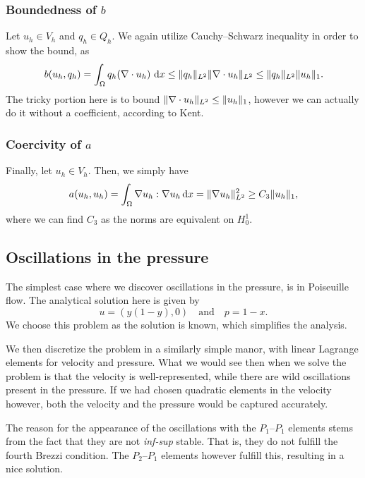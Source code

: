 \subsubsection{Boundedness of \texorpdfstring{$b$}{b}}
Let $u_h \in V_h$ and $q_h \in Q_h$.
We again utilize Cauchy--Schwarz inequality in order to show the bound, as %
\begin{equation}
    b(u_h, q_h)
    = \int_{\Omega} q_h (\nabla \cdot u_h) \, \mathop{}\!\mathrm{d} x
    \leq \lVert q_h\rVert_{L^2} \lVert\nabla \cdot u_h\rVert_{L^2}
    \leq \lVert q_h\rVert_{L^2} \lVert u_h\rVert_{1}.
\end{equation}
The tricky portion here is to bound $\lVert\nabla \cdot u_h\rVert_{L^2} \leq \lVert u_h\rVert_{1}$, however we can actually do it without a coefficient, according to Kent.

\subsubsection{Coercivity of \texorpdfstring{$a$}{a}}
Finally, let $u_h \in V_h$.
Then, we simply have
\begin{equation}
    a(u_h, u_h)
    = \int_{\Omega} \nabla u_h : \nabla u_h \mathop{}\!\mathrm{d} x
    = \lVert\nabla u_h\rVert_{L^2}^2
    \geq C_3 \lVert u_h\rVert_1,
\end{equation}
where we can find $C_3$ as the norms are equivalent on $H^1_0$.

\subsection{Oscillations in the pressure}
The simplest case where we discover oscillations in the pressure, is in Poiseuille flow.
The analytical solution here is given by
\begin{equation}
    u = (y(1 - y), 0)
    \quad\text{and}\quad
    p = 1 - x.
\end{equation}
We choose this problem as the solution is known, which simplifies the analysis.

We then discretize the problem in a similarly simple manor, with linear Lagrange elements for velocity and pressure.
What we would see then when we solve the problem is that the velocity is well-represented, while there are wild oscillations present in the pressure.
If we had chosen quadratic elements in the velocity however, both the velocity and the pressure would be captured accurately.

The reason for the appearance of the oscillations with the $P_1$--$P_1$ elements stems from the fact that they are not \textit{inf-sup} stable.
That is, they do not fulfill the fourth Brezzi condition.
The $P_{2}$--$P_{1}$ elements however fulfill this, resulting in a nice solution.

